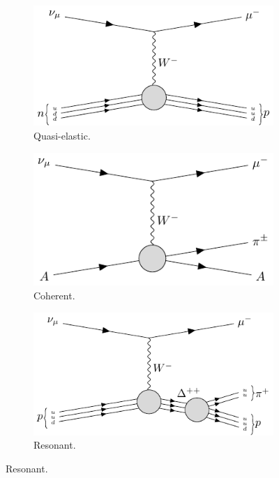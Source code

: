 \begin{figure}[t]
	\begin{subfigure}{0.5\textwidth}
		\centering
		\includegraphics[width=.90\linewidth]{Images/Nu/feynman_ccqel.pdf}
		\caption{Quasi-elastic.}
	\end{subfigure}
	\begin{subfigure}{0.5\textwidth}
		\centering
		\includegraphics[width=.90\linewidth]{Images//Nu/feynman_ccmec.pdf}
		\caption{Coherent.}
	\end{subfigure}
	\begin{subfigure}{0.5\textwidth}
		\centering
		\includegraphics[width=.90\linewidth]{Images//Nu/feynman_ccres.pdf}
		\caption{Resonant.}
	\end{subfigure}

\end{figure}
